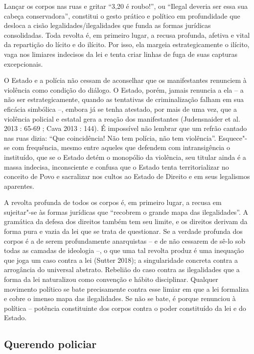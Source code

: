 Lançar os corpos nas ruas e gritar ``3,20 é roubo!'', ou ``Ilegal
deveria ser essa sua cabeça conservadora'', constitui o gesto prático e
político em profundidade que desloca a cisão legalidades/ilegalidades
que funda as formas jurídicas consolidadas. Toda revolta é, em primeiro
lugar, a recusa profunda, afetiva e vital da repartição do lícito e do
ilícito. Por isso, ela margeia estrategicamente o ilícito, vaga nos
limiares indecisos da lei e tenta criar linhas de fuga de suas capturas
excepcionais.

O Estado e a polícia não cessam de aconselhar que os manifestantes
renunciem à violência como condição do diálogo. O Estado, porém, jamais
renuncia a ela -- a não ser estrategicamente, quando as tentativas de
criminalização falham em sua eficácia simbólica --, embora já se tenha
atestado, por mais de uma vez, que a violência policial e estatal gera a
reação dos manifestantes (Judensnaider et al. 2013 : 65-69 ; Cava 2013 :
144). É impossível não lembrar que um refrão cantado nas ruas dizia:
``Que coincidência! Não tem polícia, não tem violência''. Esquece"-se com
frequência, mesmo entre aqueles que defendem com intransigência o
instituído, que se o Estado detém o monopólio da violência, seu titular
ainda é a massa indecisa, inconsciente e confusa que o Estado tenta
territorializar no conceito de Povo e sacralizar nos cultos ao Estado de
Direito e em seus legalismos aparentes.

A revolta profunda de todos os corpos é, em primeiro lugar, a recusa em
sujeitar"-se às formas jurídicas que ``recobrem o grande mapa das
ilegalidades''. A gramática da defesa dos direitos também tem seu
limite, e os direitos derivam da forma pura e vazia da lei que se trata
de questionar. Se a verdade profunda dos corpos é a de serem
profundamente anarquistas -- e de não cessarem de sê-lo sob todas as
camadas de ideologia --, o que uma tal revolta produz é uma inequação
que joga um caso contra a lei (Sutter 2018); a singularidade concreta
contra a arrogância do universal abstrato. Rebelião do caso contra as
ilegalidades que a forma da lei naturalizou como convenção e hábito
disciplinar. Qualquer movimento político se bate precisamente contra
esse limiar em que a lei formaliza e cobre o imenso mapa das
ilegalidades. Se não se bate, é porque renunciou à política -- potência
constituinte dos corpos contra o poder constituído da lei e do Estado.

\subsection{Querendo policiar}

